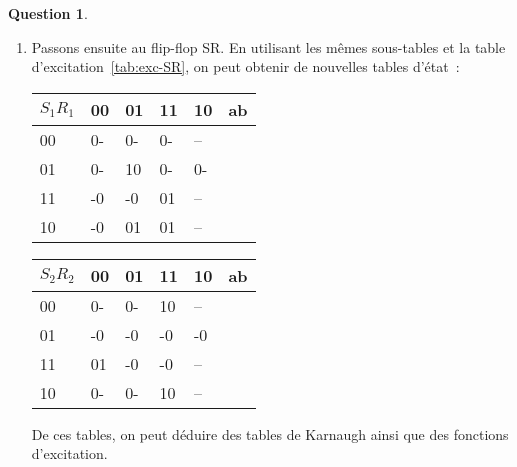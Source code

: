 \documentclass[11pt,a4paper]{article}
\theoremstyle{definition}%
\newtheorem{Q}{Question}[] %
\begin{document}
\begin{Q}
{\begin{enumerate}
			\item Passons ensuite au flip-flop SR.
			En utilisant les mêmes sous-tables et la table d'excitation~\ref{tab:exc-SR}, on peut obtenir de nouvelles tables d'état~:
			\begin{center}
				\begin{tabular}{|l|l|l|l|l|l} \hline
				$S_1R_1$ & 00         & 01         & 11         & 10         & \multicolumn{1}{l|}{ab} \\ \hline
				00           & 0- & 0- & 0- & -- & \\ \cline{1-5}
				01           & 0- & 10 & 0- & 0- & \\ \cline{1-5}
				11           & -0 & -0 & 01 & -- & \\ \cline{1-5}
				10           & -0 & 01 & 01 & -- & \\ \cline{1-5}
				\end{tabular}
				\begin{tabular}{|l|l|l|l|l|l} \hline
				$S_2R_2$ & 00         & 01         & 11         & 10         & \multicolumn{1}{l|}{ab} \\ \hline
				00           & 0- & 0- & 10 & -- & \\ \cline{1-5}
				01           & -0 & -0 & -0 & -0 & \\ \cline{1-5}
				11           & 01 & -0 & -0 & -- & \\ \cline{1-5}
				10           & 0- & 0- & 10 & -- & \\ \cline{1-5}
				\end{tabular}
			\end{center}

			De ces tables, on peut déduire des tables de Karnaugh ainsi que des fonctions d'excitation.
			\begin{center}



			\end{center}

		\end{enumerate}
	}

\end{Q}
\end{document}
